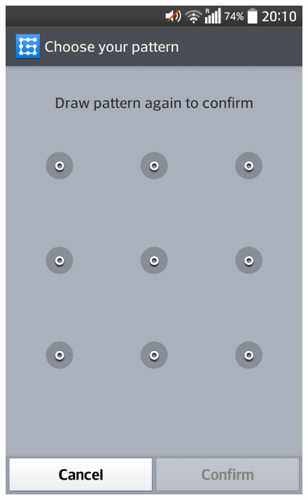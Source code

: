 \begin{figure}[H]
{        \includegraphics[scale=0.08]{pics/experiment/patternprocess5.png}
        \label{fig:redrawpattern}
      }
\end{figure}
